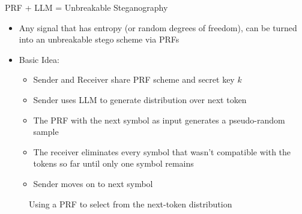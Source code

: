 \documentclass[8pt]{beamer}
\begin{document}
\begin{frame}{PRF + LLM = Unbreakable Steganography}

    \begin{itemize}
        \item Any signal that has entropy (or random degrees of freedom), can be turned into an unbreakable stego scheme via PRFs
        \item Basic Idea:
        \begin{itemize}
            \item Sender and Receiver share PRF scheme and secret key $k$
            \item Sender uses LLM to generate distribution over next token
            \item The PRF with the next symbol as input generates a pseudo-random sample
            \item The receiver eliminates every symbol that wasn't compatible with the tokens so far until only one symbol remains
            \item Sender moves on to next symbol
        \end{itemize}
    \end{itemize}


\begin{figure}
    \centering
{}
    \caption{Using a PRF to select from the next-token distribution}
    \label{fig:placeholder}
\end{figure}
    
\end{frame}
\end{document}
